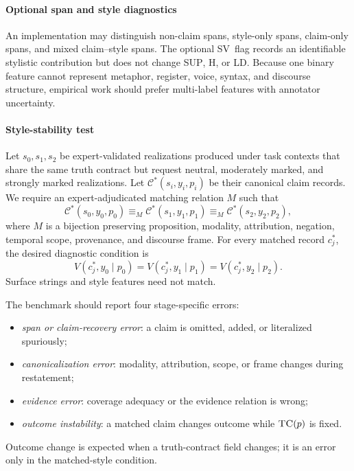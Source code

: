 \documentclass{clv2025}
\newcommand{\TC}{\textsc{TC}}
\newcommand{\LD}{\textsc{LD}}
\newcommand{\Hall}{\textsc{H}}
\newcommand{\SUP}{\textsc{SUP}}
\newcommand{\SV}{\textsc{SV}}
\begin{document}
\appendix

%
\makeatletter\def\@currentlabel{A}\makeatother\label{app:diagnostics}

\paragraph{Optional span and style diagnostics}
An implementation may distinguish non-claim spans, style-only spans,
claim-only spans, and mixed claim--style spans.
The optional \SV\ flag records an identifiable stylistic contribution but
does not change \SUP, \Hall, or \LD.
Because one binary feature cannot represent metaphor, register, voice,
syntax, and discourse structure, empirical work should prefer
multi-label features with annotator uncertainty.

\paragraph{Style-stability test}
Let $s_0,s_1,s_2$ be expert-validated realizations produced under task
contexts that share the same truth contract but request neutral,
moderately marked, and strongly marked realizations.
Let $\mathcal C^*(s_i,y_i,p_i)$ be their canonical claim records.
We require an expert-adjudicated matching relation $M$ such that
\begin{equation}
\mathcal C^*(s_0,y_0,p_0)\equiv_M
\mathcal C^*(s_1,y_1,p_1)\equiv_M
\mathcal C^*(s_2,y_2,p_2),
\label{eq:stability}
\end{equation}
where $M$ is a bijection preserving proposition, modality, attribution,
negation, temporal scope, provenance, and discourse frame.
For every matched record $c_j^*$, the desired diagnostic condition is
\[
V(c_j^*,y_0\mid p_0)=V(c_j^*,y_1\mid p_1)
=V(c_j^*,y_2\mid p_2).
\]
Surface strings and style features need not match.

The benchmark should report four stage-specific errors:
\begin{itemize}
  \item \emph{span or claim-recovery error}: a claim is omitted, added, or
  literalized spuriously;
  \item \emph{canonicalization error}: modality, attribution, scope, or
  frame changes during restatement;
  \item \emph{evidence error}: coverage adequacy or the evidence relation is
  wrong;
  \item \emph{outcome instability}: a matched claim changes outcome while
  $\TC(p)$ is fixed.
\end{itemize}
Outcome change is expected when a truth-contract field changes; it is an
error only in the matched-style condition.
\end{document}
